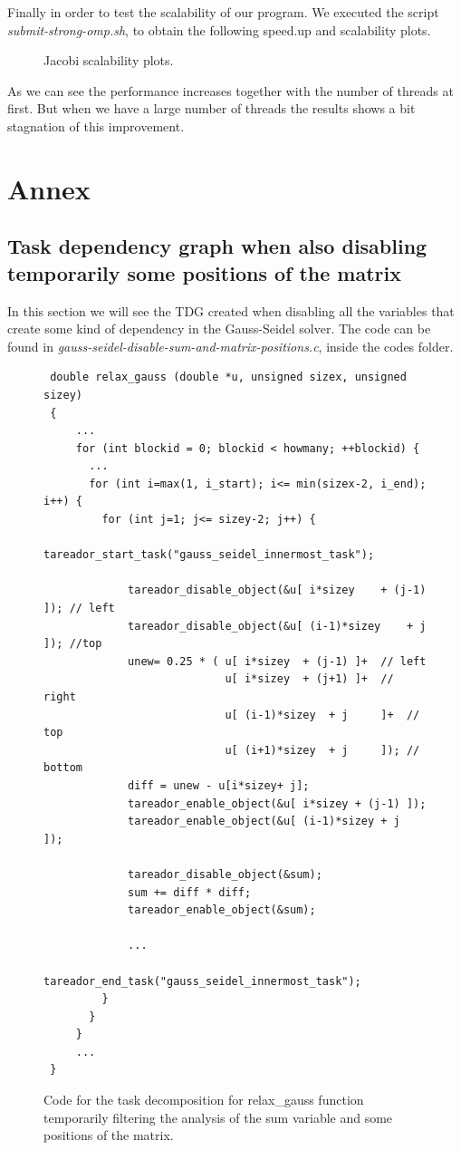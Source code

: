 \documentclass[12pt, a4paper]{article}
\begin{document}
Finally in order to test the scalability of our program. We executed the script \textit{submit-strong-omp.sh}, to obtain the following speed.up and scalability plots.

\begin{figure}[H]
	\centering
	\caption{Jacobi scalability plots.}
\end{figure}

As we can see the performance increases together with the number of threads at first. But when we have a large number of threads the results shows a bit stagnation of this improvement.

\section{Annex}
\subsection{Task dependency graph when also disabling temporarily some positions of the matrix}

In this section we will see the TDG created when disabling all the variables that create some kind of dependency in the Gauss-Seidel solver. The code can be found in \textit{gauss-seidel-disable-sum-and-matrix-positions.c}, inside the codes folder.

\begin{figure}[H]
\begin{lstlisting}
 double relax_gauss (double *u, unsigned sizex, unsigned sizey)
 {
     ...
     for (int blockid = 0; blockid < howmany; ++blockid) {
       ...
       for (int i=max(1, i_start); i<= min(sizex-2, i_end); i++) {
         for (int j=1; j<= sizey-2; j++) {
			 tareador_start_task("gauss_seidel_innermost_task");
 				
			 tareador_disable_object(&u[ i*sizey	+ (j-1) ]); // left
			 tareador_disable_object(&u[ (i-1)*sizey	+ j     ]); //top
			 unew= 0.25 * ( u[ i*sizey	+ (j-1) ]+  // left
 				   			u[ i*sizey	+ (j+1) ]+  // right
				    		u[ (i-1)*sizey	+ j     ]+  // top
				    		u[ (i+1)*sizey	+ j     ]); // bottom
			 diff = unew - u[i*sizey+ j];
			 tareador_enable_object(&u[ i*sizey	+ (j-1) ]);
			 tareador_enable_object(&u[ (i-1)*sizey	+ j     ]);
 			
			 tareador_disable_object(&sum);
			 sum += diff * diff; 
			 tareador_enable_object(&sum);
 			
			 ...
			 tareador_end_task("gauss_seidel_innermost_task");
         }
       }
     }
	 ...
 }
\end{lstlisting}
\caption{Code for the task decomposition for relax\_gauss function temporarily filtering the analysis of the sum variable and some positions of the matrix.}
\end{figure}
\end{document}
